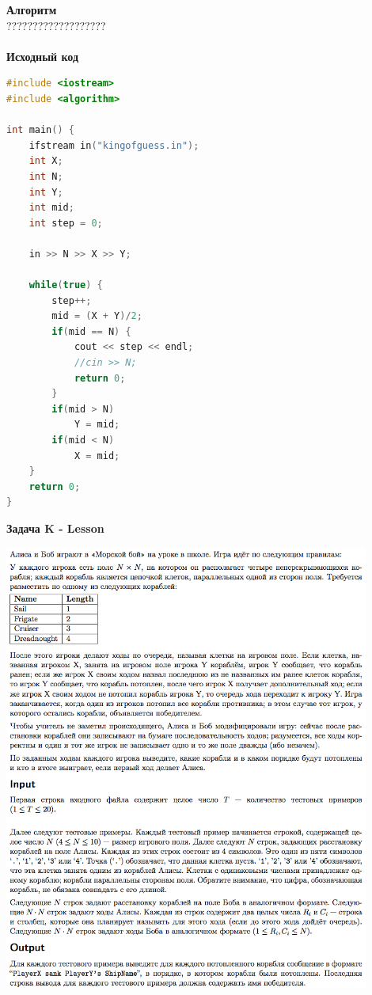 \documentclass[a4paper,12pt]{article}
\begin{document}
\textbf{{\large Алгоритм}} \\
{\Huge ???????????????????} \\ 
\\
\textbf{{\large Исходный код}}
\begin{lstlisting}[language=C++]
#include <iostream>
#include <algorithm>

int main() {
    ifstream in("kingofguess.in");
	int X;
	int N;
	int Y;
	int mid;
	int step = 0;

	in >> N >> X >> Y;

	while(true) {
		step++;
		mid = (X + Y)/2;
		if(mid == N) {
			cout << step << endl;
			//cin >> N;
			return 0;
		}
		if(mid > N)
			Y = mid;
		if(mid < N)
			X = mid;
	}
    return 0;
}
\end{lstlisting}

\textbf{{\large Задача K - Lesson}} \\
\begin{center}
\includegraphics[width=0.9\textwidth]{OC_Karelia/OC_Karelia_K.png}\\ [1cm]
\end{center}
\newpage
\end{document}
